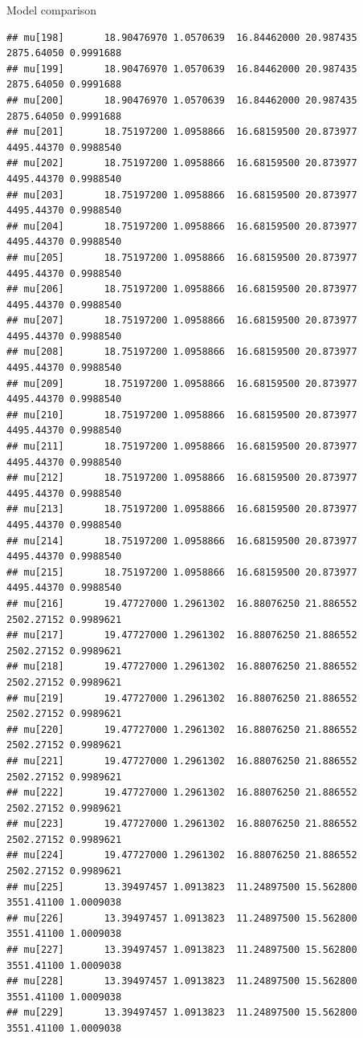 \documentclass[
  ignorenonframetext,
]{beamer}
\begin{document}
\begin{frame}[fragile]{Model comparison}
\begin{verbatim}
## mu[198]       18.90476970 1.0570639  16.84462000 20.987435 2875.64050 0.9991688
## mu[199]       18.90476970 1.0570639  16.84462000 20.987435 2875.64050 0.9991688
## mu[200]       18.90476970 1.0570639  16.84462000 20.987435 2875.64050 0.9991688
## mu[201]       18.75197200 1.0958866  16.68159500 20.873977 4495.44370 0.9988540
## mu[202]       18.75197200 1.0958866  16.68159500 20.873977 4495.44370 0.9988540
## mu[203]       18.75197200 1.0958866  16.68159500 20.873977 4495.44370 0.9988540
## mu[204]       18.75197200 1.0958866  16.68159500 20.873977 4495.44370 0.9988540
## mu[205]       18.75197200 1.0958866  16.68159500 20.873977 4495.44370 0.9988540
## mu[206]       18.75197200 1.0958866  16.68159500 20.873977 4495.44370 0.9988540
## mu[207]       18.75197200 1.0958866  16.68159500 20.873977 4495.44370 0.9988540
## mu[208]       18.75197200 1.0958866  16.68159500 20.873977 4495.44370 0.9988540
## mu[209]       18.75197200 1.0958866  16.68159500 20.873977 4495.44370 0.9988540
## mu[210]       18.75197200 1.0958866  16.68159500 20.873977 4495.44370 0.9988540
## mu[211]       18.75197200 1.0958866  16.68159500 20.873977 4495.44370 0.9988540
## mu[212]       18.75197200 1.0958866  16.68159500 20.873977 4495.44370 0.9988540
## mu[213]       18.75197200 1.0958866  16.68159500 20.873977 4495.44370 0.9988540
## mu[214]       18.75197200 1.0958866  16.68159500 20.873977 4495.44370 0.9988540
## mu[215]       18.75197200 1.0958866  16.68159500 20.873977 4495.44370 0.9988540
## mu[216]       19.47727000 1.2961302  16.88076250 21.886552 2502.27152 0.9989621
## mu[217]       19.47727000 1.2961302  16.88076250 21.886552 2502.27152 0.9989621
## mu[218]       19.47727000 1.2961302  16.88076250 21.886552 2502.27152 0.9989621
## mu[219]       19.47727000 1.2961302  16.88076250 21.886552 2502.27152 0.9989621
## mu[220]       19.47727000 1.2961302  16.88076250 21.886552 2502.27152 0.9989621
## mu[221]       19.47727000 1.2961302  16.88076250 21.886552 2502.27152 0.9989621
## mu[222]       19.47727000 1.2961302  16.88076250 21.886552 2502.27152 0.9989621
## mu[223]       19.47727000 1.2961302  16.88076250 21.886552 2502.27152 0.9989621
## mu[224]       19.47727000 1.2961302  16.88076250 21.886552 2502.27152 0.9989621
## mu[225]       13.39497457 1.0913823  11.24897500 15.562800 3551.41100 1.0009038
## mu[226]       13.39497457 1.0913823  11.24897500 15.562800 3551.41100 1.0009038
## mu[227]       13.39497457 1.0913823  11.24897500 15.562800 3551.41100 1.0009038
## mu[228]       13.39497457 1.0913823  11.24897500 15.562800 3551.41100 1.0009038
## mu[229]       13.39497457 1.0913823  11.24897500 15.562800 3551.41100 1.0009038

\end{verbatim}
\end{frame}
\end{document}
